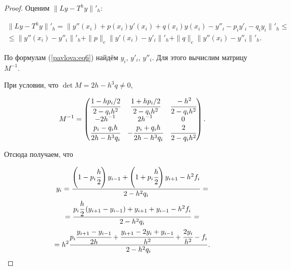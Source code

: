 \begin{proof} Оценим $\| Ly-T^hy\|'_h$:

\begin{multline}

\label{pavlova:eq10}

\| Ly-T^hy\|'_h =\| y''(x_i) + p(x_i) y'(x_i) + q(x_i) y (x_i) - y''_i - p_i y'_i - q_i y_i \|'_h \le \\

\le \|y''(x_i )- y''_i \|'_h +\| p\|

_c \| y'(x_i) - y'_i \|'_h + \| q\|_c

\| y''(x_i )-y''_i \|'_h .

\end{multline}



По формулам (\ref{pavlova:eq6}) найдём $y_i$, $y'_i$, $y''_i$. Для этого вычислим матрицу $M^{-1}$.

При условии, что $\det M=2h-h^3q \ne 0$, 

\[

M^{-1}=\begin{pmatrix}

\cfrac{1-{h}p_i/2}{2-q_i h^2}  & \cfrac{1+{h}p_i/2}{2-q_i h^2} & \cfrac{-h^2}{2-q_i h^2} \\

-{2h}^{-1}& {2h}^{-1} & 0  \\

\cfrac{p_i -q_i h}{2h-h^3q_i } & -\cfrac{p_i +q_i h}{2h-h^3q_i} & \cfrac{2}{2-q_i h^2}

\end{pmatrix}.

\]

Отсюда получаем, что

\begin{multline*}

y_i =\frac{\left(1-p_i \cfrac{h}{2}\right)y_{i-1} +\left(1+p_i \cfrac{h}{2}\right)y_{i+1} - h^2f_i

}{2-h^2q_i}=\\

=\frac{p_i \cfrac{h}{2}\left(y_{i+1} -y_{i-1} \right)+y_{i+1} +y_{i-1}

-h^2f_i}{2-h^2q_i}= \\

 =h^2\frac{p_i \cfrac{y_{i+1} -y_{i-1}}{2h}+\cfrac{y_{i+1} -2y_i +y_{i-1}

}{h^2}+\cfrac{2y_i}{h^2}-f_i}{2-h^2q_i}.

\end{multline*}


\end{proof}
